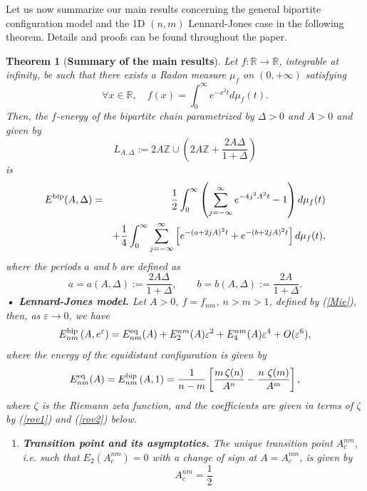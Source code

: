 \documentclass[12pt]{iopart}
\newtheorem{thm}{Theorem}[section]
\theoremstyle{definition}
\newcommand{\R}{\mathbb R}
\newcommand{\Z}{\mathbb Z}
\begin{document}
Let us now summarize our main results concerning the general bipartite configuration model and the 1D $(n,m)$ Lennard-Jones case in the following theorem. Details and proofs can be found throughout the paper.
\begin{thm}[\textbf{Summary of the main results}]
Let $f:\R\to \R$, integrable at infinity, be such that there exists a Radon measure $\mu_f$ on $(0,+\infty)$ satisfying
$$
\forall x\in \R,\quad f(x)=\int_0^\infty e^{-x^2 t}d\mu_f(t).
$$
Then, the $f$-energy of the bipartite chain parametrized by $\Delta>0$ and $A>0$ and given by
$$
L_{A,\Delta}:=2A\Z \cup \left( 2A\Z + \frac{2A\Delta}{1+\Delta}\right)
$$
is
\begin{eqnarray} 
E^{\rm bip}(A,\Delta) & = & \frac{1}{2} \int_0^{\infty} \left(
\sum_{j=-\infty}^{\infty} e^{-4j^2 A^2 t} - 1 \right) d\mu_f(t) \nonumber \\
& & + \frac{1}{4} \int_0^{\infty} \sum_{j=-\infty}^{\infty}
\left[ e^{-(a+2jA)^2 t} + e^{-(b+2jA)^2 t} \right] d\mu_f(t) , \label{biprepr2intro}
\end{eqnarray}
where the periods $a$ and $b$ are defined as
\begin{equation} \label{periodsintro}
a=a(A,\Delta) := \frac{2A\Delta}{1+\Delta} ,
\qquad b=b(A,\Delta) := \frac{2A}{1+\Delta} . 
\end{equation}
\textbf{• Lennard-Jones model.} Let $A>0$, $f=f_{nm}$, $n>m>1$, defined by (\ref{Mie}), then, as $\varepsilon\to 0$, we have
\begin{equation} \label{trans}
E_{nm}^{\rm bip}\left( A,e^{\varepsilon}\right) = E_{nm}^{\rm eq}(A)
+ E_2^{nm}(A) \varepsilon^2 + E_4^{nm}(A) \varepsilon^4 + O(\varepsilon^6), 
\end{equation}
where the energy of the equidistant configuration is given by
\begin{equation} \label{energd1intro}
E_{nm}^{\rm eq}(A) =E_{nm}^{\rm bip}\left( A,1\right)= \frac{1}{n-m} \left[ \frac{m\, \zeta(n)}{A^n}
-\frac{n\ \zeta(m)}{A^m} \right],
\end{equation}
where $\zeta$ is the Riemann zeta function, and the coefficients are given in terms of $\zeta$  by (\ref{rov1}) and (\ref{rov2}) below.
\begin{enumerate}
\item[-] \textbf{Transition point and its asymptotics.} The unique transition point $A_c^{nm}$, i.e. such that $E_2(A_c^{nm})=0$ with a change of sign at $A=A_c^{nm}$, is given by
\begin{equation} \label{astar}
A_c^{nm} = \frac{1}{2} 

\end{equation}
\end{enumerate}
\end{thm}
\end{document}
